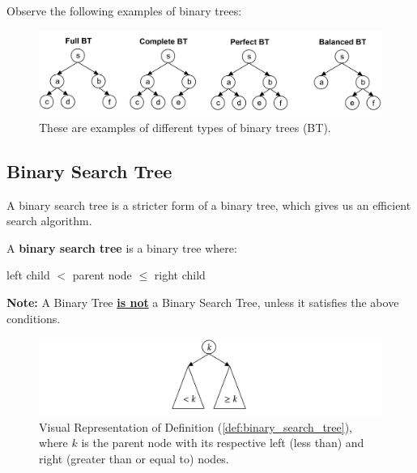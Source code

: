 \newpage

\noindent
Observe the following examples of binary trees:
\begin{figure}[h]
    \begin{center}
    \includegraphics[width=\textwidth]{./Sections/graphs/search/binary_tree_types.png}
    \end{center}
     \caption{These are examples of different types of binary trees (BT).}\label{fig:binary_tree_types}
  \end{figure}


\subsection{Binary Search Tree}
\noindent
A binary search tree is a stricter form of a binary tree, which gives us an efficient search algorithm.
\begin{Def}

    \label{def:binary_search_tree}

    A \textbf{binary search tree} is a binary tree where:
    
    \begin{center}
        left child $<$ parent node $\leq$ right child
    \end{center}
    \noindent
    \textbf{Note:} A Binary Tree \underline{\textbf{is not}} a Binary Search Tree, unless it satisfies the above conditions.
\end{Def}

\begin{figure}[h]
    \begin{center}
    \includegraphics[width=\textwidth]{./Sections/graphs/search/bst.png}
    \end{center}
     \caption{Visual Representation of Definition (\ref{def:binary_search_tree}), where $k$ is 
     the parent node with its respective left (less than) and right (greater than or equal to) nodes.}\label{fig:binary_search_tree}
  \end{figure}

